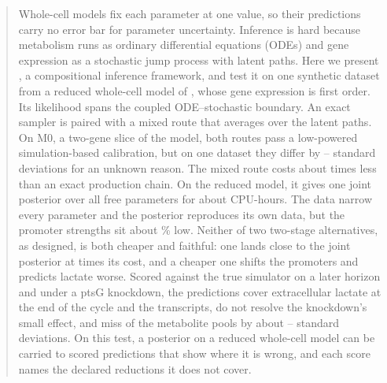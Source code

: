 \begin{abstract}
Whole-cell models fix each parameter at one value, so their predictions carry no error bar for
parameter uncertainty. Inference is hard because metabolism runs as ordinary differential
equations (ODEs) and gene expression as a stochastic jump process with latent paths. Here we
present \IC{}, a compositional inference framework, and test it on one synthetic dataset from a
reduced whole-cell model of \syn{}, whose gene expression is first order. Its likelihood spans
the coupled ODE--stochastic boundary. An exact sampler is paired with a mixed route that
averages over the latent paths. On M0, a two-gene slice of the model, both routes pass a
low-powered simulation-based calibration, but on one dataset they differ by
-- standard deviations for an unknown reason. The mixed route costs
about  times less than an exact production chain. On the reduced model, it gives
one joint posterior over all  free parameters for about 
CPU-hours. The data narrow every parameter and the posterior reproduces its own data, but the
promoter strengths sit about \% low. Neither of two two-stage alternatives,
as designed, is both cheaper and faithful: one lands close to the joint posterior at
 times its cost, and a cheaper one shifts the promoters and predicts lactate
worse. Scored against the true simulator on a later horizon and under a ptsG knockdown, the
predictions cover extracellular lactate at the end of the cycle and the transcripts, do not
resolve the knockdown's small effect, and miss  of the 
metabolite pools by about -- standard deviations. On this
test, a posterior on a reduced whole-cell model can be carried to scored predictions that show
where it is wrong, and each score names the declared reductions it does not cover.
\end{abstract}
